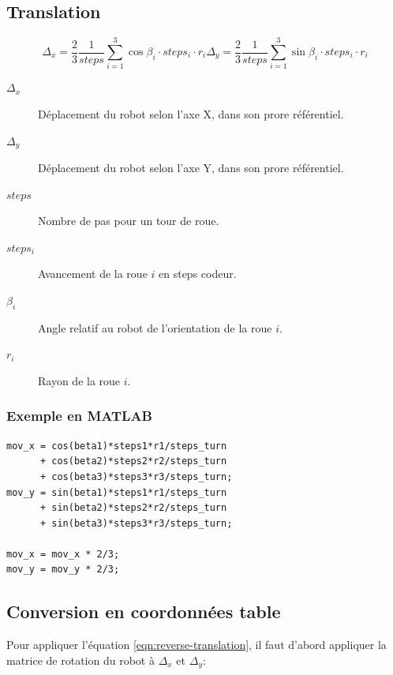 \documentclass[a4paper]{paper}
\begin{document}
\subsection{Translation}
\begin{subequations}
    \begin{equation}
    \Delta_x = \frac{2}{3} \frac{1}{steps} \sum\limits_{i=1}^3 \cos \beta_i \cdot steps_i \cdot r_i 
    \end{equation}
    \begin{equation}
    \Delta_y = \frac{2}{3} \frac{1}{steps} \sum\limits_{i=1}^3 \sin \beta_i \cdot steps_i \cdot r_i 
    \end{equation}

    \label{eqn:reverse-translation}
\end{subequations}
\begin{description}
    \item[$\Delta_x$] Déplacement du robot selon l'axe X, dans son prore référentiel.
    \item[$\Delta_y$] Déplacement du robot selon l'axe Y, dans son prore référentiel.
    \item[$steps$] Nombre de pas pour un tour de roue.
    \item[$steps_i$] Avancement de la roue $i$ en steps codeur.
    \item[$\beta_i$] Angle relatif au robot de l'orientation de la roue $i$.
    \item[$r_i$] Rayon de la roue $i$.
\end{description}


\subsubsection{Exemple en MATLAB}
\begin{lstlisting}
mov_x = cos(beta1)*steps1*r1/steps_turn
      + cos(beta2)*steps2*r2/steps_turn
      + cos(beta3)*steps3*r3/steps_turn;
mov_y = sin(beta1)*steps1*r1/steps_turn
      + sin(beta2)*steps2*r2/steps_turn
      + sin(beta3)*steps3*r3/steps_turn;

mov_x = mov_x * 2/3;
mov_y = mov_y * 2/3;
\end{lstlisting}

\subsection{Conversion en coordonnées table}
Pour appliquer l'équation \eqref{eqn:reverse-translation}, il faut d'abord appliquer
la matrice de rotation du robot à $\Delta_x$ et $\Delta_y$:
\end{document}
